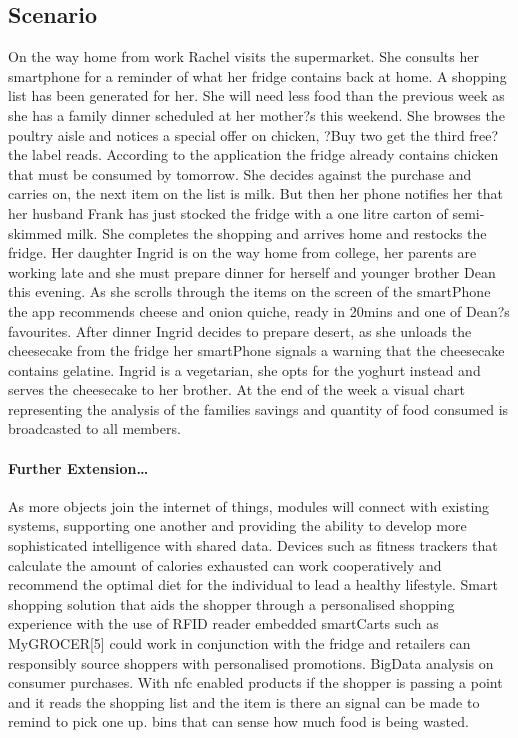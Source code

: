 \documentclass[a4paper, 11pt]{article}
\begin{document}
\subsection{Scenario}On the way home from work Rachel visits the supermarket. She consults her smartphone for a reminder of what her fridge contains back at home. A shopping list has been generated for her. She will need less food than the previous week as she has a family dinner scheduled at her mother?s this weekend. She browses the poultry aisle and notices a special offer on chicken, ?Buy two get the third free? the label reads. According to the application the fridge already contains chicken that must be consumed by tomorrow. She decides against the purchase and carries on, the next item on the list is milk. But then her phone notifies her that her husband Frank has just stocked the fridge with a one litre carton of semi-skimmed milk. She completes the shopping and arrives home and restocks the fridge. Her daughter Ingrid is on the way home from college, her parents are working late and she must prepare dinner for herself and younger brother Dean this evening. As she scrolls through the items on the screen of the smartPhone the app recommends cheese and onion quiche, ready in 20mins and one of Dean?s favourites. After dinner Ingrid decides to prepare desert, as she unloads the cheesecake from the fridge her smartPhone signals a warning that the cheesecake contains gelatine. Ingrid is a vegetarian, she opts for the yoghurt instead and serves the cheesecake to her brother. At the end of the week a visual chart representing the analysis of the families savings and quantity of food consumed is broadcasted to all members.

\paragraph{Further Extension\dots} As more objects join the internet of things, modules will connect with existing systems, supporting one another and providing the ability to develop more sophisticated intelligence with shared data. Devices such as fitness trackers that calculate the amount of calories exhausted can work cooperatively and recommend the optimal diet for the individual to lead a healthy lifestyle. Smart shopping solution that aids the shopper through a personalised shopping experience with the use of RFID reader embedded smartCarts such as MyGROCER[5] could work in conjunction with the fridge and retailers can responsibly source shoppers with personalised promotions. BigData analysis on consumer purchases. With nfc enabled products if the shopper is passing a point and it reads the shopping list and the item is there an signal can be made to remind to pick one up. bins that can sense how much food is being wasted.
\end{document}
